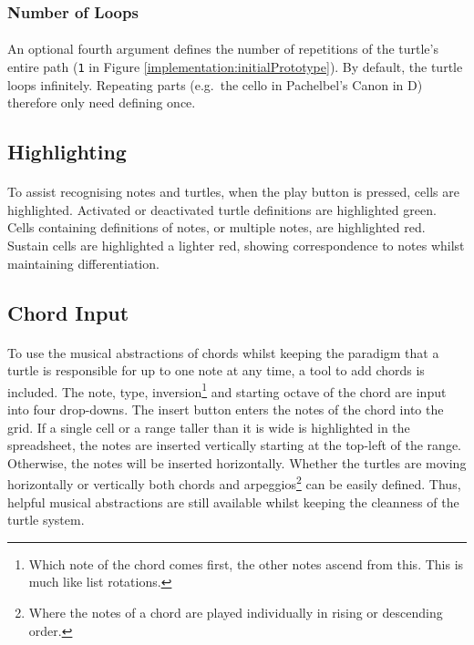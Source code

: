\vspace{-5pt}
\subsubsection{Number of Loops}

\paragraph{} An optional fourth argument defines the number of repetitions of the turtle's entire path (\texttt{1} in Figure \ref{implementation:initialPrototype}). By default, the turtle loops infinitely. Repeating parts (e.g.~the cello in Pachelbel's Canon in D) therefore only need defining once.

\subsection{Highlighting}

\paragraph{} To assist recognising notes and turtles, when the play button is pressed, cells are highlighted. Activated or deactivated turtle definitions are highlighted green. Cells containing definitions of notes, or multiple notes, are highlighted red. Sustain cells are highlighted a lighter red, showing correspondence to notes whilst maintaining differentiation.

\subsection{Chord Input}

\paragraph{} To use the musical abstractions of chords whilst keeping the paradigm that a turtle is responsible for up to one note at any time, a tool to add chords is included. The note, type, inversion\footnote{Which note of the chord comes first, the other notes ascend from this. This is much like list rotations.} and starting octave of the chord are input into four drop-downs. The insert button enters the notes of the chord into the grid. If a single cell or a range taller than it is wide is highlighted in the spreadsheet, the notes are inserted vertically starting at the top-left of the range. Otherwise, the notes will be inserted horizontally. Whether the turtles are moving horizontally or vertically both chords and arpeggios\footnote{Where the notes of a chord are played individually in rising or descending order.} can be easily defined. Thus, helpful musical abstractions are still available whilst keeping the cleanness of the turtle system.

